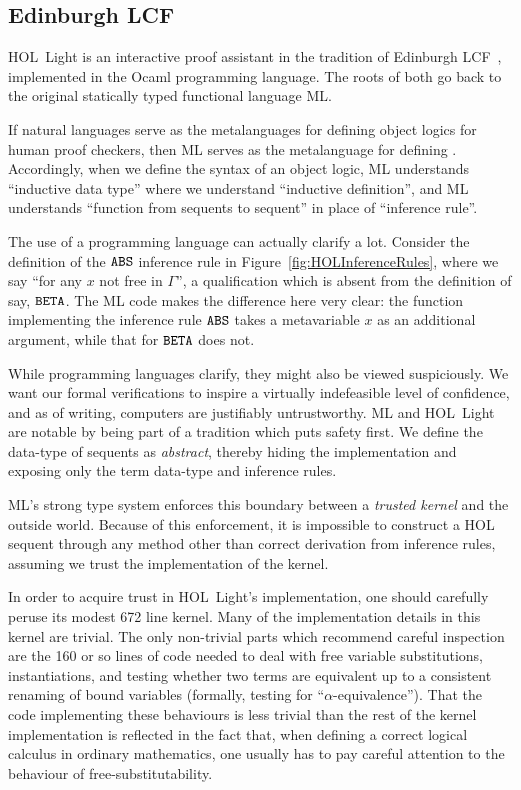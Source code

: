 \subsection{Edinburgh LCF}
HOL~Light is an interactive proof assistant in the tradition of Edinburgh LCF~\cite{LCF}, implemented in the Ocaml programming language. The roots of both go back to the original statically typed functional language ML.

If natural languages serve as the metalanguages for defining object logics for human proof checkers, then ML serves as the metalanguage for defining . Accordingly, when we define the syntax of an object logic, ML understands ``inductive data type'' where we understand ``inductive definition'', and ML understands ``function from sequents to sequent'' in place of ``inference rule''.

The use of a programming language can actually clarify a lot. Consider the definition of the $\texttt{ABS}$ inference rule in Figure~\ref{fig:HOLInferenceRules}, where we say ``for any $x$ not free in $\Gamma$'', a qualification which is absent from the definition of say, $\texttt{BETA}$. The ML code makes the difference here very clear: the function implementing the inference rule $\texttt{ABS}$ takes a metavariable $x$ as an additional argument, while that for $\texttt{BETA}$ does not.

While programming languages clarify, they might also be viewed suspiciously. We want our formal verifications to inspire a virtually indefeasible level of confidence, and as of writing, computers are justifiably untrustworthy. ML and HOL~Light are notable by being part of a tradition which puts safety first. We define the data-type of sequents as \emph{abstract}, thereby hiding the implementation and exposing only the term data-type and inference rules.

ML's strong type system enforces this boundary between a \emph{trusted kernel} and the outside world. Because of this enforcement, it is impossible to construct a HOL sequent through any method other than correct derivation from inference rules, assuming we trust the implementation of the kernel.

In order to acquire trust in HOL~Light's implementation, one should carefully peruse its modest 672 line kernel. Many of the implementation details in this kernel are trivial. The only non-trivial parts which recommend careful inspection are the 160 or so lines of code needed to deal with free variable substitutions, instantiations, and testing whether two terms are equivalent up to a consistent renaming of bound variables (formally, testing for ``$\alpha$-equivalence''). That the code implementing these behaviours is less trivial than the rest of the kernel implementation is reflected in the fact that, when defining a correct logical calculus in ordinary mathematics, one usually has to pay careful attention to the behaviour of free-substitutability. 

